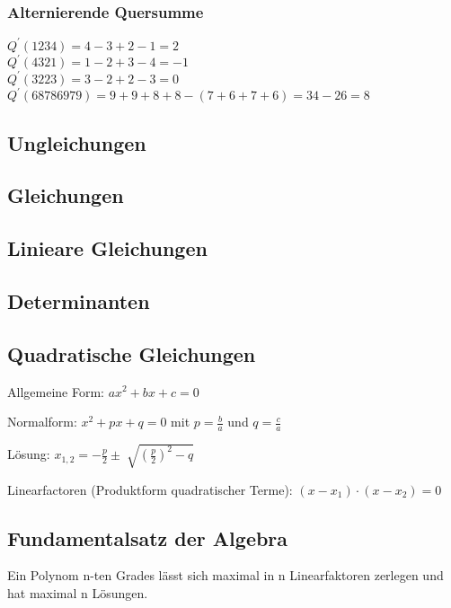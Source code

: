 \subsubsection{Alternierende Quersumme}

$Q^{\prime}(1234)=4-3+2-1=2$\\
$Q^{\prime}(4321)=1-2+3-4=-1$\\
$Q^{\prime}(3223)=3-2+2-3=0$\\
$Q^{\prime}(68786979)=9+9+8+8-(7+6+7+6)=34-26=8$





\subsection{Ungleichungen}
\subsection{Gleichungen}
\subsection{Linieare Gleichungen}
\subsection{Determinanten}
\subsection{Quadratische Gleichungen}
Allgemeine Form:
$ ax^2 + bx + c = 0 $

Normalform:
$ x^2 + px + q = 0 $ mit $p=\frac{b}{a}$ und $q=\frac{c}{a}$

Lösung: $x_{1,2}= - \frac{p}{2} \pm \sqrt[]{( \frac{p}{2})^2 -q }$

Linearfactoren (Produktform quadratischer Terme): $(x-x_1)\cdot (x-x_2 )=0$


\subsection{Fundamentalsatz der Algebra}
Ein Polynom n-ten Grades lässt sich maximal in n Linearfaktoren zerlegen und hat maximal n Lösungen.
